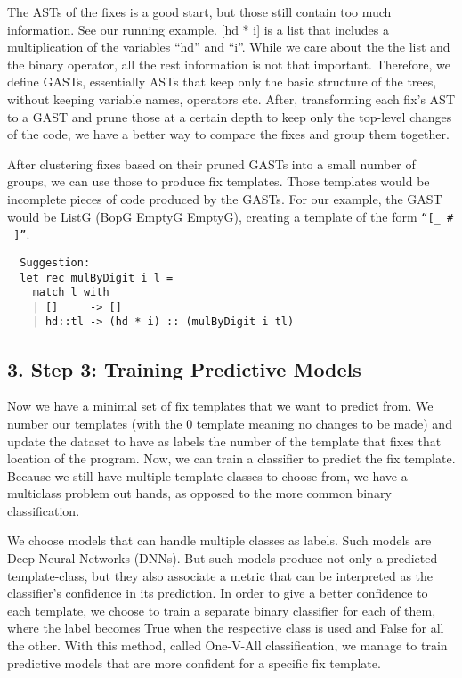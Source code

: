  The ASTs of the fixes is a good start, but those still contain too much information. See our running example. [hd * i] is a list that includes a multiplication of the variables “hd” and “i”. While we care about the the list and the binary operator, all the rest information is not that important. Therefore, we define GASTs, essentially ASTs that keep only the basic structure of the trees, without keeping variable names, operators etc. After, transforming each fix’s AST to a GAST and prune those at a certain depth to keep only the top-level changes of the code, we have a better way to compare the fixes and group them together.

 After clustering fixes based on their pruned GASTs into a small number of groups, we can use those to produce fix templates. Those templates would be incomplete pieces of code produced by the GASTs. For our example, the GAST would be ListG (BopG EmptyG EmptyG), creating a template of the form \texttt{“[\_ \# \_]”}.

\begin{verbatim}
  Suggestion:
  let rec mulByDigit i l =
    match l with
    | []     -> []
    | hd::tl -> (hd * i) :: (mulByDigit i tl)
\end{verbatim}



\subsection{3. Step 3: Training Predictive Models}

Now we have a minimal set of fix templates that we want to predict from. We number our templates (with the 0 template meaning no changes to be made) and update the dataset to have as labels the number of the template that fixes that location of the program. Now, we can train a classifier to predict the fix template. Because we still have multiple template-classes to choose from, we have a multiclass problem out hands, as opposed to the more common binary classification.

 We choose models that can handle multiple classes as labels. Such models are Deep Neural Networks (DNNs). But such models produce not only a predicted template-class, but they also associate a metric that can be interpreted as the classifier’s confidence in its prediction. In order to give a better confidence to each template, we choose to train a separate binary classifier for each of them, where the label becomes True when the respective class is used and False for all the other. With this method, called One-V-All classification, we manage to train predictive models that are more confident for a specific fix template.



